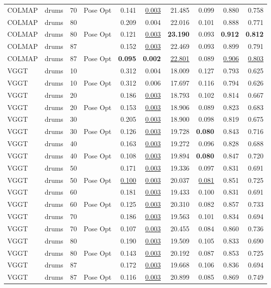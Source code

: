 \begin{table}[H]
\begin{tabular}{llrlrrrrrr}
COLMAP & drums & 70 & Pose Opt & 0.141 & \underline{0.003} & 21.485 & 0.099 & 0.880 & 0.758 \\
COLMAP & drums & 80 &  & 0.209 & 0.004 & 22.016 & 0.101 & 0.888 & 0.771 \\
COLMAP & drums & 80 & Pose Opt & 0.121 & \underline{0.003} & \textbf{23.190} & 0.093 & \textbf{0.912} & \textbf{0.812} \\
COLMAP & drums & 87 &  & 0.152 & \underline{0.003} & 22.469 & 0.093 & 0.899 & 0.791 \\
COLMAP & drums & 87 & Pose Opt & \textbf{0.095} & \textbf{0.002} & \underline{22.801} & 0.089 & \underline{0.906} & \underline{0.803} \\
VGGT & drums & 10 &  & 0.312 & 0.004 & 18.009 & 0.127 & 0.793 & 0.625 \\
VGGT & drums & 10 & Pose Opt & 0.312 & 0.006 & 17.697 & 0.116 & 0.794 & 0.626 \\
VGGT & drums & 20 &  & 0.186 & \underline{0.003} & 18.793 & 0.102 & 0.814 & 0.667 \\
VGGT & drums & 20 & Pose Opt & 0.153 & \underline{0.003} & 18.906 & 0.089 & 0.823 & 0.683 \\
VGGT & drums & 30 &  & 0.205 & \underline{0.003} & 18.900 & 0.098 & 0.819 & 0.675 \\
VGGT & drums & 30 & Pose Opt & 0.126 & \underline{0.003} & 19.728 & \textbf{0.080} & 0.843 & 0.716 \\
VGGT & drums & 40 &  & 0.163 & \underline{0.003} & 19.272 & 0.096 & 0.828 & 0.688 \\
VGGT & drums & 40 & Pose Opt & 0.108 & \underline{0.003} & 19.894 & \textbf{0.080} & 0.847 & 0.720 \\
VGGT & drums & 50 &  & 0.171 & \underline{0.003} & 19.336 & 0.097 & 0.831 & 0.691 \\
VGGT & drums & 50 & Pose Opt & \underline{0.100} & \underline{0.003} & 20.037 & \underline{0.081} & 0.851 & 0.725 \\
VGGT & drums & 60 &  & 0.181 & \underline{0.003} & 19.433 & 0.100 & 0.831 & 0.691 \\
VGGT & drums & 60 & Pose Opt & 0.125 & \underline{0.003} & 20.310 & 0.082 & 0.857 & 0.733 \\
VGGT & drums & 70 &  & 0.186 & \underline{0.003} & 19.563 & 0.101 & 0.834 & 0.694 \\
VGGT & drums & 70 & Pose Opt & 0.107 & \underline{0.003} & 20.455 & 0.084 & 0.860 & 0.736 \\
VGGT & drums & 80 &  & 0.190 & \underline{0.003} & 19.509 & 0.105 & 0.833 & 0.690 \\
VGGT & drums & 80 & Pose Opt & 0.143 & \underline{0.003} & 20.192 & 0.087 & 0.853 & 0.725 \\
VGGT & drums & 87 &  & 0.172 & \underline{0.003} & 19.668 & 0.106 & 0.836 & 0.694 \\
VGGT & drums & 87 & Pose Opt & 0.116 & \underline{0.003} & 20.899 & 0.085 & 0.869 & 0.749 \\
\bottomrule
\end{tabular}
\end{table}